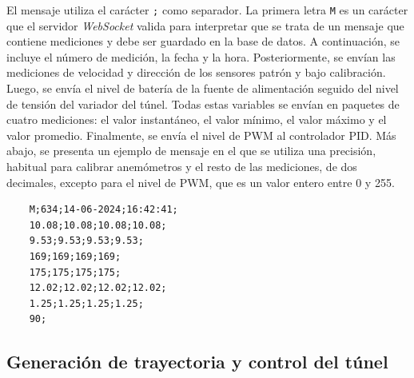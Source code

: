 

El mensaje utiliza el carácter \texttt{;} como separador. La primera letra \texttt{M} es un carácter que el servidor \textit{WebSocket} valida para interpretar que se trata de un mensaje que contiene mediciones y debe ser guardado en la base de datos. A continuación, se incluye el número de medición, la fecha y la hora. Posteriormente, se envían las mediciones de velocidad y dirección de los sensores patrón y bajo calibración. Luego, se envía el nivel de batería de la fuente de alimentación seguido del nivel de tensión del variador del túnel. Todas estas variables se envían en paquetes de cuatro mediciones: el valor instantáneo, el valor mínimo, el valor máximo y el valor promedio. Finalmente, se envía el nivel de PWM al controlador PID. Más abajo, se presenta un ejemplo de mensaje en el que se utiliza una precisión, habitual para calibrar anemómetros y el resto de las mediciones, de dos decimales, excepto para el nivel de PWM, que es un valor entero entre 0 y 255.

\begin{verbatim}
    M;634;14-06-2024;16:42:41;
    10.08;10.08;10.08;10.08;
    9.53;9.53;9.53;9.53;
    169;169;169;169;
    175;175;175;175;
    12.02;12.02;12.02;12.02;
    1.25;1.25;1.25;1.25;
    90;
\end{verbatim}

\subsection{Generación de trayectoria y control del túnel}\label{sec:genTrayec}

